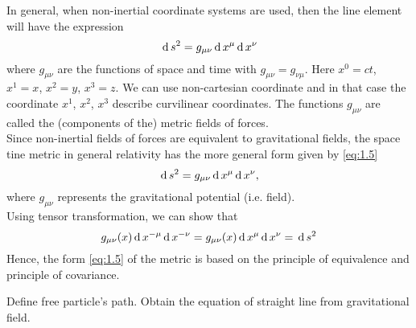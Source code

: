 \documentclass[../main-sheet.tex]{subfiles}
\begin{document}
\begin{soln}
In general, when non-inertial coordinate systems are used, then the line element will have the expression
\begin{equation}
    \,\mathrm{d}\, s^2=g_{\mu\nu}\,\mathrm{d}\, x^\mu\,\mathrm{d}\, x^\nu\label{eq:1.5}
\end{equation}
where \(g_{\mu\nu}\) are the functions of space and time with \(g_{\mu\nu}=g_{\nu\mu}\). Here \(x^0 = ct\), \(x^1 = x\), \(x^2 = y\), \(x^3 = z\).
We can use non-cartesian coordinate and in that case the coordinate \(x^1\), \(x^2\), \(x^3\) describe curvilinear coordinates.
The functions \(g_{\mu\nu}\) are called the (components of the) metric fields of forces.\\
Since non-inertial fields of forces are equivalent to gravitational fields, the space tine  metric  in  general  relativity  has  the	more general form given by \eqref{eq:1.5}
\[\,\mathrm{d}\, s^2=g_{\mu\nu}\,\mathrm{d}\, x^\mu\,\mathrm{d}\, x^\nu,\]
where \(g_{\mu\nu}\) represents the gravitational potential (i.e. field).\\
Using tensor transformation, we can show that
\[g_{\mu\nu}(x)\,\mathrm{d}\, x^{-\mu}\,\mathrm{d}\, x^{-\nu}=g_{\mu\nu}(x)\,\mathrm{d}\, x^{\mu}\,\mathrm{d}\, x^\nu=\,\mathrm{d}\, s^2\]
Hence, the form \eqref{eq:1.5} of the metric is based on the principle of equivalence and principle of covariance.
\end{soln}
\begin{prob}
    Define free particle's path. Obtain the equation of straight line from gravitational field.
\end{prob}
\end{document}
